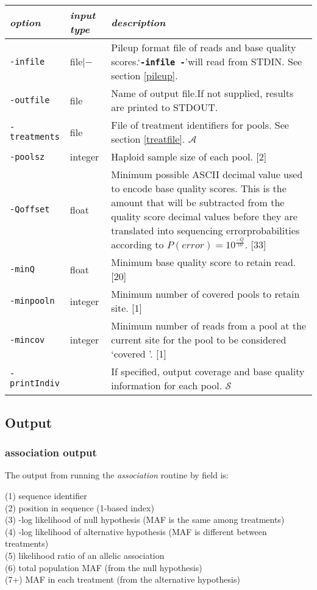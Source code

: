 \documentclass[12pt]{article}
\newcommand{\poolsz}{2}
\newcommand{\qoffset}{33}
\newcommand{\minq}{20}
\newcommand{\minpooln}{1}
\newcommand{\mincov}{1}
\newenvironment{argdescrip}
{	
\begin{tabular}
	{| m{1in} | m{1in} | m{4in}|}
	\hline
	\textit{option} & \textit{input type} & \textit{description}\\
	\hline
}
{
	\hline
	\end{tabular}
}
\begin{document}
\begin{argdescrip}
\texttt{-infile} & file$|-$ & Pileup format file of reads and base quality scores.\newline\lq\texttt{\textbf{-infile -}}\rq\hspace{5pt}will read from STDIN. See section \ref{pileup}.\\
\hline
\texttt{-outfile} & file & Name of output file.\newline If not supplied, results are printed to STDOUT.\\
\hline
\texttt{-treatments} & file & File of treatment identifiers for pools. See section \ref{treatfile}. $\mathcal{A}$\\
\hline
\texttt{-poolsz} & integer & Haploid sample size of each pool. [\poolsz]\\
\hline
\texttt{-Qoffset} & float & Minimum possible ASCII decimal value used to encode base quality scores. This is the amount that will be subtracted from the quality score decimal values before they are translated into sequencing error\newline probabilities according to $P(error)=10^{\frac{-Q}{10}}$. [\qoffset]\\
\hline
\texttt{-minQ} & float & Minimum base quality score to retain read. [\minq]\\
\hline
\texttt{-minpooln} & integer & Minimum number of covered pools to retain site. [\minpooln]\\
\hline
\texttt{-mincov} & integer & Minimum number of reads from a pool at the current site for the pool to be considered \lq covered \rq. [\mincov]\\
\hline
\texttt{-printIndiv} & & If specified, output coverage and base quality information for each pool. $\mathcal{S}$\\
\end{argdescrip}

\subsection{Output}
\subsubsection{association output}
The output from running the \textit{association} routine by field is:

\vspace{5mm}

(1) sequence identifier\\
(2) position in sequence (1-based index)\\
(3) -log likelihood of null hypothesis (MAF is the same among treatments)\\
(4) -log likelihood of alternative hypothesis (MAF is different between treatments)\\
(5) likelihood ratio of an allelic association\\
(6) total population MAF (from the null hypothesis)\\
(7+) MAF in each treatment (from the alternative hypothesis)
\end{document}

